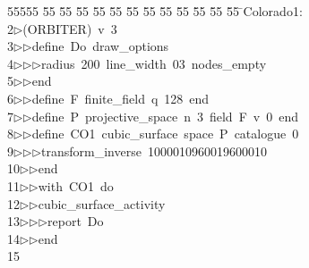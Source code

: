 %
%
\begin{tabbing}
55555 \= 55 \= 55 \= 55 \= 55 \= 55 \= 55 \= 55 \= 55 \= 55 \= 55 \= 55 \= 55 \= \>Colorado1:\\[0pt]
2\>$\triangleright$\>(ORBITER)\ v\ 3\ \\[0pt]
3\>$\triangleright$\>$\triangleright$\>define\ Do\ draw\_options\ \\[0pt]
4\>$\triangleright$\>$\triangleright$\>$\triangleright$\>radius\ 200\ line\_width\ 03\ nodes\_empty\ \\[0pt]
5\>$\triangleright$\>$\triangleright$\>end\ \\[0pt]
6\>$\triangleright$\>$\triangleright$\>define\ F\ finite\_field\ q\ 128\ end\ \\[0pt]
7\>$\triangleright$\>$\triangleright$\>define\ P\ projective\_space\ n\ 3\ field\ F\ v\ 0\ end\ \\[0pt]
8\>$\triangleright$\>$\triangleright$\>define\ CO1\ cubic\_surface\ space\ P\ catalogue\ 0\ \\[0pt]
9\>$\triangleright$\>$\triangleright$\>$\triangleright$\>transform\_inverse\ 1000010960019600010\ \\[0pt]
10\>$\triangleright$\>$\triangleright$\>end\ \\[0pt]
11\>$\triangleright$\>$\triangleright$\>with\ CO1\ do\ \\[0pt]
12\>$\triangleright$\>$\triangleright$\>cubic\_surface\_activity\ \\[0pt]
13\>$\triangleright$\>$\triangleright$\>$\triangleright$\>report\ Do\ \\[0pt]
14\>$\triangleright$\>$\triangleright$\>end\\[0pt]
15\>\end{tabbing}
